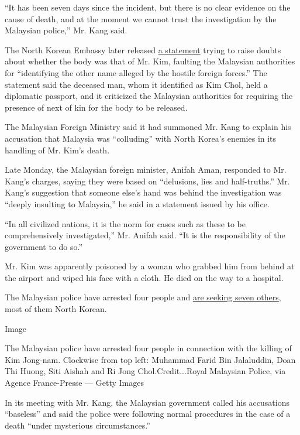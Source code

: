 ``It has been seven days since the incident, but there is no clear
evidence on the cause of death, and at the moment we cannot trust the
investigation by the Malaysian police,'' Mr. Kang said.

The North Korean Embassy later released
\href{https://twitter.com/trinnaleong/status/833593463320907781}{a
statement} trying to raise doubts about whether the body was that of Mr.
Kim, faulting the Malaysian authorities for ``identifying the other name
alleged by the hostile foreign forces.'' The statement said the deceased
man, whom it identified as Kim Chol, held a diplomatic passport, and it
criticized the Malaysian authorities for requiring the presence of next
of kin for the body to be released.

The Malaysian Foreign Ministry said it had summoned Mr. Kang to explain
his accusation that Malaysia was ``colluding'' with North Korea's
enemies in its handling of Mr. Kim's death.

Late Monday, the Malaysian foreign minister, Anifah Aman, responded to
Mr. Kang's charges, saying they were based on ``delusions, lies and
half-truths.'' Mr. Kang's suggestion that someone else's hand was behind
the investigation was ``deeply insulting to Malaysia,'' he said in a
statement issued by his office.

``In all civilized nations, it is the norm for cases such as these to be
comprehensively investigated,'' Mr. Anifah said. ``It is the
responsibility of the government to do so.''

Mr. Kim was apparently poisoned by a woman who grabbed him from behind
at the airport and wiped his face with a cloth. He died on the way to a
hospital.

The Malaysian police have arrested four people and
\href{https://www.nytimes3xbfgragh.onion/2017/02/19/world/asia/malaysia-killing-of-kim-jong-nam.html}{are
seeking seven others}, most of them North Korean.

Image

The Malaysian police have arrested four people in connection with the
killing of Kim Jong-nam. Clockwise from top left: Muhammad Farid Bin
Jalaluddin, Doan Thi Huong, Siti Aishah and Ri Jong Chol.Credit...Royal
Malaysian Police, via Agence France-Presse --- Getty Images

In its meeting with Mr. Kang, the Malaysian government called his
accusations ``baseless'' and said the police were following normal
procedures in the case of a death ``under mysterious circumstances.''

